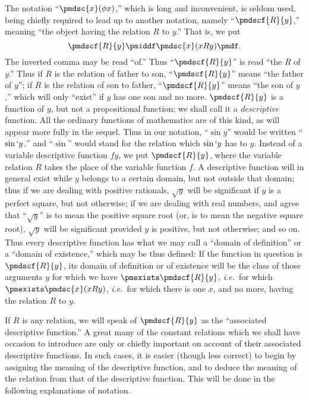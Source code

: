 \documentclass[letterpaper,12pt,openany,leqno]{book}
\newcommand{\pagefirst}[1]{\marginnote[\boxed{\text{#1}}]{\boxed{\text{#1}}}}
\begin{document}
The notation ``$\pmdsc{x}(\phi x)$,'' which is long and inconvenient, is seldom used, being chiefly required to lead up to another notation, namely ``$\pmdscf{R}{y}$,'' meaning ``the object having the relation $R$ to $y$.'' That is, we put
\[
	\pmdscf{R}{y} \pmiddf \pmdsc{x}(xRy) \pmdf.
\]
The inverted comma may be read ``of.'' Thus ``$\pmdscf{R}{y}$'' is read ``the $R$ of $y$.'' Thus if $R$ is the relation of father to son, ``$\pmdscf{R}{y}$'' means ``the father of $y$''; if $R$ is the relation of son to father, ``$\pmdscf{R}{y}$'' means ``the son of $y$,'' which will \pagefirst{33} only ``exist'' if $y$ has one son and no more. $\pmdscf{R}{y}$ is a function of $y$, but not a propositional function; we shall call it a \textit{descriptive} function. All the ordinary functions of mathematics are of this kind, as will appear more fully in the sequel. Thus in our notation, ``$\sin y$'' would be written ``$\sin`y$,'' and ``$\sin$'' would stand for the relation which $\sin`y$ has to $y$. Instead of a variable descriptive function $fy$, we put $\pmdscf{R}{y}$, where the variable relation $R$ takes the place of the variable function $f$. A descriptive function will in general exist while $y$ belongs to a certain domain, but not outside that domain; thus if we are dealing with positive rationals, $\surd{y}$ will be significant if $y$ is a perfect square, but not otherwise; if we are dealing with real numbers, and agree that ``$\surd{y}$'' is to mean the positive square root (or, is to mean the negative square root), $\surd{y}$ will be significant provided $y$ is positive, but not otherwise; and so on. Thus every descriptive function has what we may call a ``domain of definition'' or a ``domain of existence,'' which may be thus defined: If the function in question is $\pmdscf{R}{y}$, its domain of definition or of existence will be the class of those arguments $y$ for which we have $\pmexists\pmdscf{R}{y}$, \textit{i.e.}\ for which $\pmexists\pmdsc{x}(xRy)$, \textit{i.e.}\ for which there is one $x$, and no more, having the relation $R$ to $y$. 

If $R$ is any relation, we will speak of $\pmdscf{R}{y}$ as the ``associated descriptive function.'' A great many of the constant relations which we shall have occasion to introduce are only or chiefly important on account of their associated descriptive functions. In such cases, it is easier (though less correct) to begin by assigning the meaning of the descriptive function, and to deduce the meaning of the relation from that of the descriptive function. This will be done in the following explanations of notation. 
\end{document}
